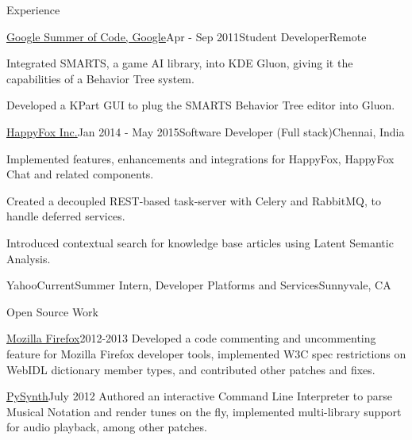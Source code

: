 \documentclass{resume} %
\begin{document}
\begin{rSection}{Experience}
\vspace{2mm}

\begin{rSubsection}{\href{https://www.google-melange.com/gsoc/project/details/google/gsoc2011/pranavrc/5757334940811264}{Google Summer of Code, Google}}{Apr - Sep 2011}{Student Developer}{Remote}
\item Integrated SMARTS, a game AI library, into KDE Gluon, giving it the capabilities of a Behavior Tree system.
\item Developed a KPart GUI to plug the SMARTS Behavior Tree editor into Gluon.
\end{rSubsection}


\begin{rSubsection}{\href{https://happyfox.com/}{HappyFox Inc.}}{Jan 2014 - May 2015}{Software Developer (Full stack)}{Chennai, India}
\item Implemented features, enhancements and integrations for HappyFox, HappyFox Chat and related components.
\item Created a decoupled REST-based task-server with Celery and RabbitMQ, to handle deferred services.
\item Introduced contextual search for knowledge base articles using Latent Semantic Analysis.
\end{rSubsection}


\begin{rSubsection}{Yahoo}{Current}{Summer Intern, Developer Platforms and Services}{Sunnyvale, CA}
\end{rSubsection}

\end{rSection}


\begin{rSection}{Open Source Work}
\vspace{2mm}

\begin{rSubsection}{\href{https://bugzilla.mozilla.org/user\%5Fprofile?user\%5Fid=431664}{Mozilla Firefox}}{2012-2013}{}{}
Developed a code commenting and uncommenting feature for Mozilla Firefox developer tools, implemented W3C spec restrictions on WebIDL dictionary member types, and contributed other patches and fixes.
\end{rSubsection}

\begin{rSubsection}{\href{https://github.com/mdoege/PySynth/commits?author=pranavrc}{PySynth}}{July 2012}{}{}
Authored an interactive Command Line Interpreter to parse Musical Notation and render tunes on the fly, implemented multi-library support for audio playback, among other patches.
\end{rSubsection}

\end{rSection}
\end{document}
